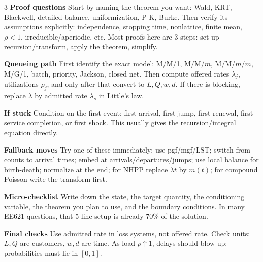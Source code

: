 \documentclass[a4paper,8pt,fleqn]{extarticle}
\newcommand{\1}{\mathbf{1}}
\newcommand{\sub}[1]{\textbf{#1} }
\begin{document}
\begin{multicols}{3}
\sub{Proof questions} Start by naming the theorem you want: Wald, KRT, Blackwell, detailed balance, uniformization, P-K, Burke. Then verify its assumptions explicitly: independence, stopping time, nonlattice, finite mean, \(\rho<1\), irreducible/aperiodic, etc. Most proofs here are 3 steps: set up recursion/transform, apply the theorem, simplify.

\sub{Queueing path} First identify the exact model: M/M/1, M/M/\(m\), M/M/\(m\)/\(m\), M/G/1, batch, priority, Jackson, closed net. Then compute offered rates \(\lambda_j\), utilizations \(\rho_j\), and only after that convert to \(L,Q,w,d\). If there is blocking, replace \(\lambda\) by admitted rate \(\lambda_s\) in Little's law.

\sub{If stuck} Condition on the first event: first arrival, first jump, first renewal, first service completion, or first shock. This usually gives the recursion/integral equation directly.

\sub{Fallback moves} Try one of these immediately: use pgf/mgf/LST; switch from counts to arrival times; embed at arrivals/departures/jumps; use local balance for birth-death; normalize at the end; for NHPP replace \(\lambda t\) by \(m(t)\); for compound Poisson write the transform first.

\sub{Micro-checklist} Write down the state, the target quantity, the conditioning variable, the theorem you plan to use, and the boundary conditions. In many EE621 questions, that 5-line setup is already \(70\%\) of the solution.

\sub{Final checks} Use admitted rate in loss systems, not offered rate. Check units: \(L,Q\) are customers, \(w,d\) are time. As load \(\rho\uparrow1\), delays should blow up; probabilities must lie in \([0,1]\).

\end{multicols}
\end{document}
